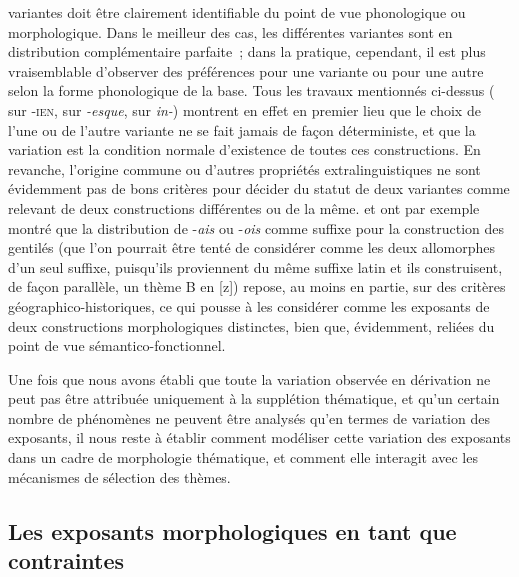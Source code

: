 \documentclass[output=paper]{langsci/langscibook}
\begin{document}
variantes doit être clairement identifiable du point de vue phonologique
ou morphologique. Dans le meilleur des cas, les différentes variantes
sont en distribution complémentaire parfaite~; dans la pratique,
cependant, il est plus vraisemblable d'observer des préférences pour une
variante ou pour une autre selon la forme phonologique de la base. Tous
les travaux mentionnés ci-dessus %
(\citealt{LignonStephanie2011} sur \textsc{-ien}, \citealt{PlenatLignonSernaTanguy2002} sur \emph{-esque}, \citealt{Apotheloz2003} sur \emph{in-})
%
montrent en effet en premier lieu que le choix de
l'une ou de l'autre variante ne se fait jamais de façon déterministe, et
que la variation est la condition normale d'existence de toutes ces
constructions. En revanche, l'origine commune ou d'autres propriétés
extralinguistiques ne sont évidemment pas de bons critères pour décider
du statut de deux variantes comme relevant de deux constructions
différentes ou de la même. %
\citet{Plenat2008a} %
%
et %
\citet{Roche16} %
%
ont
par exemple montré que la distribution de -\emph{ais} ou -\emph{ois}
comme suffixe pour la construction des gentilés (que l'on pourrait être
tenté de considérer comme les deux allomorphes d'un seul suffixe,
puisqu'ils proviennent du même suffixe latin et ils construisent, de
façon parallèle, un thème B en {[}z{]}) repose, au moins en partie, sur
des critères géographico-historiques, ce qui pousse à les considérer
comme les exposants de deux constructions morphologiques distinctes,
bien que, évidemment, reliées du point de vue sémantico-fonctionnel.

Une fois que nous avons établi que toute la variation observée en
dérivation ne peut pas être attribuée uniquement à la supplétion
thématique, et qu'un certain nombre de phénomènes ne peuvent être
analysés qu'en termes de variation des exposants, il nous reste à
établir comment modéliser cette variation des exposants dans un cadre de
morphologie thématique, et comment elle interagit avec les mécanismes de
sélection des thèmes.

\subsection{Les exposants morphologiques en tant que contraintes}\label{sec:montermini:2.2}
\end{document}

